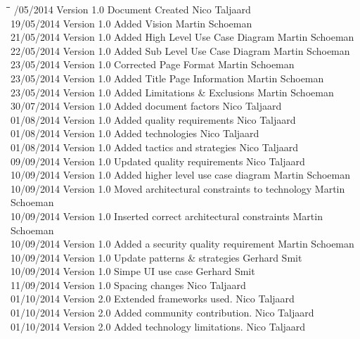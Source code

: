 \documentclass[letterpaper]{article}
\begin{document}
		\begin{tabbing}
			\hspace*{2.5cm}\=\hspace*{2.5cm}\=\hspace*{8cm}\=\hspace*{3cm} /05/2014	\> Version 1.0	\> Document Created 							\> Nico Taljaard \\
			19/05/2014  \> Version 1.0  \> Added Vision									\> Martin Schoeman \\
			21/05/2014  \> Version 1.0  \> Added High Level Use Case Diagram			\> Martin Schoeman\\
			22/05/2014  \> Version 1.0  \> Added Sub Level Use Case Diagram				\> Martin Schoeman\\
			23/05/2014  \> Version 1.0  \> Corrected Page Format						\> Martin Schoeman \\
			23/05/2014  \> Version 1.0  \> Added Title Page Information					\> Martin Schoeman \\
			23/05/2014  \> Version 1.0  \> Added Limitations \& Exclusions				\> Martin Schoeman \\
			30/07/2014	\> Version 1.0	\> Added document factors						\> Nico Taljaard \\
			01/08/2014	\> Version 1.0	\> Added quality requirements					\> Nico Taljaard \\
			01/08/2014	\> Version 1.0	\> Added technologies							\> Nico Taljaard \\
			01/08/2014	\> Version 1.0	\> Added tactics and strategies					\> Nico Taljaard \\
			09/09/2014	\> Version 1.0	\> Updated quality requirements					\> Nico Taljaard \\
			10/09/2014 	\> Version 1.0  \> Added higher level use case diagram			\> Martin Schoeman\\
			10/09/2014  \> Version 1.0	\> Moved architectural constraints to technology\> Martin Schoeman\\
			10/09/2014  \> Version 1.0  \> Inserted correct architectural constraints	\> Martin Schoeman\\
			10/09/2014	\> Version 1.0  \> Added a security quality requirement			\> Martin Schoeman\\
			10/09/2014	\> Version 1.0	\> Update patterns \& strategies				\> Gerhard Smit \\
			10/09/2014	\> Version 1.0	\> Simpe UI use case							\> Gerhard Smit \\
			11/09/2014	\> Version 1.0	\> Spacing changes								\> Nico Taljaard \\
			01/10/2014	\> Version 2.0	\> Extended frameworks used.					\> Nico Taljaard \\
			01/10/2014	\> Version 2.0	\> Added community contribution.				\> Nico Taljaard \\
			01/10/2014	\> Version 2.0	\> Added technology limitations.				\> Nico Taljaard \\
		\end{tabbing}
		
\end{document}
